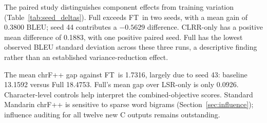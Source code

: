 \documentclass[11pt]{article}
\newcommand{\FT}{\textsc{FT}}
\begin{document}
The paired study distinguishes component effects from training variation (Table~\ref{tab:seed_deltas}). Full exceeds \FT\ in two seeds, with a mean gain of 0.3800 BLEU; seed 44 contributes a $-0.5629$ difference. CLRR-only has a positive mean difference of 0.1883, with one positive paired seed. Full has the lowest observed BLEU standard deviation across these three runs, a descriptive finding rather than an established variance-reduction effect.

The mean chrF++ gap against \FT\ is 1.7316, largely due to seed 43: baseline 13.1592 versus Full 18.4753. Full's mean gap over LSR-only is only 0.0926. Character-level controls help interpret the combined-objective scores. Standard Mandarin chrF++ is sensitive to sparse word bigrams (Section~\ref{sec:influence}); influence auditing for all twelve new C outputs remains outstanding.
\end{document}
